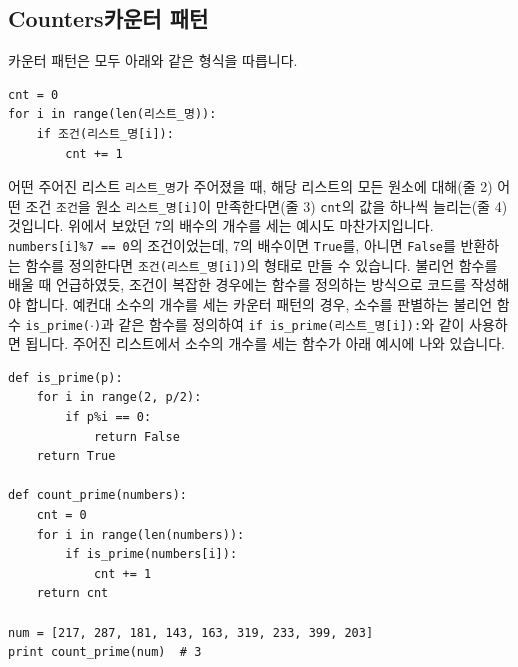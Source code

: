 \documentclass[../main.tex]{subfiles}
\begin{document}
\subsection{Counters카운터 패턴}
카운터 패턴은 모두 아래와 같은 형식을 따릅니다.
\begin{verbatim}
cnt = 0
for i in range(len(리스트_명)):
    if 조건(리스트_명[i]):
        cnt += 1
\end{verbatim}
어떤 주어진 리스트 \texttt{리스트\_명}가 주어졌을 때, 해당 리스트의 모든 원소에 대해(줄 2) 어떤 조건 \texttt{조건}을 원소 \texttt{리스트\_명[i]}이 만족한다면(줄 3) \texttt{cnt}의 값을 하나씩 늘리는(줄 4) 것입니다.
위에서 보았던 7의 배수의 개수를 세는 예시도 마찬가지입니다.
\texttt{numbers[i]\%7 == 0}의 조건이었는데, 7의 배수이면 \texttt{True}를, 아니면 \texttt{False}를 반환하는 함수를 정의한다면 \texttt{조건(리스트\_명[i])}의 형태로 만들 수 있습니다.
불리언 함수를 배울 때 언급하였듯, 조건이 복잡한 경우에는 함수를 정의하는 방식으로 코드를 작성해야 합니다.
예컨대 소수의 개수를 세는 카운터 패턴의 경우, 소수를 판별하는 불리언 함수 \texttt{is\_prime($\cdot$)}과 같은 함수를 정의하여 \texttt{if is\_prime(리스트\_명[i]):}와 같이 사용하면 됩니다.
주어진 리스트에서 소수의 개수를 세는 함수가 아래 예시에 나와 있습니다.
\begin{verbatim}
def is_prime(p):
    for i in range(2, p/2):
        if p%i == 0:
            return False
    return True

def count_prime(numbers):
    cnt = 0
    for i in range(len(numbers)):
        if is_prime(numbers[i]):
            cnt += 1
    return cnt

num = [217, 287, 181, 143, 163, 319, 233, 399, 203]
print count_prime(num)  # 3
\end{verbatim}
\end{document}
